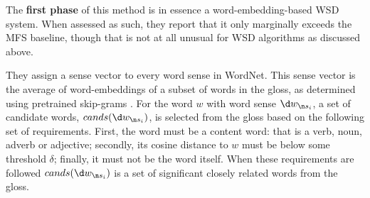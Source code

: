 {The \textbf{first phase} of this method is in essence a word-embedding-based WSD system.
When assessed as such, they report that it only marginally exceeds the MFS baseline,
though that is not at all unusual for WSD algorithms as discussed above.

They assign a sense vector to every word sense in WordNet.
This sense vector is the average of word-embeddings of a subset of words in the gloss,
as determined using pretrained skip-grams \parencite{mikolov2013efficient}.
For the word $w$ with word sense $\d w_{\n s_i}$,
a set of candidate words, $cands(\d w_{\n s_i})$, is selected from the gloss 
based on the following set of requirements.
First, the word must be a content word: that is a verb, noun, adverb or adjective;
secondly, its cosine distance to $w$ must be below some threshold $\delta$;
finally, it must not be the word itself.
When these requirements are followed $cands(\d w_{\n s_i})$ is a set of significant closely related words from the gloss.


}

